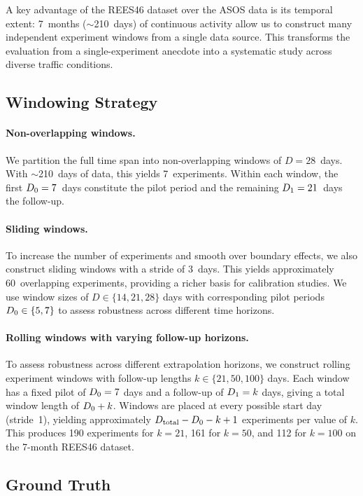 A key advantage of the REES46 dataset over the ASOS data is its
temporal extent: 7~months ($\sim$210~days) of continuous activity
allow us to construct many independent experiment windows from a
single data source.
This transforms the evaluation from a single-experiment anecdote
into a systematic study across diverse traffic conditions.

\subsection{Windowing Strategy}
\label{subsec:windowing}

\paragraph{Non-overlapping windows.}
We partition the full time span into non-overlapping windows of
$D = 28$~days.
With $\sim$210~days of data, this yields 7~experiments.
Within each window, the first $D_0 = 7$~days constitute the
pilot period and the remaining $D_1 = 21$~days the follow-up.

\paragraph{Sliding windows.}
To increase the number of experiments and smooth over
boundary effects, we also construct sliding windows with a
stride of 3~days.
This yields approximately 60~overlapping experiments,
providing a richer basis for calibration studies.
We use window sizes of $D \in \{14, 21, 28\}$ days with
corresponding pilot periods $D_0 \in \{5, 7\}$ to
assess robustness across different time horizons.

\paragraph{Rolling windows with varying follow-up horizons.}
{\color{purple}To assess robustness across different extrapolation horizons,
we construct rolling experiment windows with follow-up lengths
$k \in \{21, 50, 100\}$ days.
Each window has a fixed pilot of $D_0 = 7$ days and a follow-up
of $D_1 = k$ days, giving a total window length of $D_0 + k$.
Windows are placed at every possible start day (stride~1),
yielding approximately $D_{\mathrm{total}} - D_0 - k + 1$
experiments per value of $k$.
This produces 190 experiments for $k=21$, 161 for $k=50$, and
112 for $k=100$ on the 7-month REES46 dataset.}

\subsection{Ground Truth}
\label{subsec:ground_truth}

